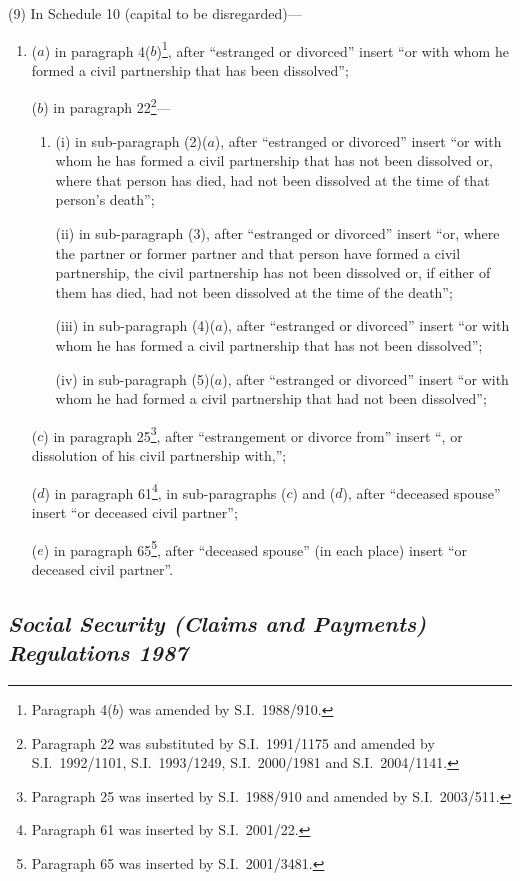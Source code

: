 \documentclass[12pt,a4paper]{article}
\begin{document}
(9) In Schedule 10 (capital to be disregarded)—
\begin{enumerate}\item[]
($a$) in paragraph 4($b$)\footnote{Paragraph 4($b$) was amended by S.I.\ 1988/910.}, after “estranged or divorced” insert “or with whom he formed a civil partnership that has been dissolved”;

($b$) in paragraph 22\footnote{Paragraph 22 was substituted by S.I.\ 1991/1175 and amended by S.I.\ 1992/1101, S.I.\ 1993/1249, S.I.\ 2000/1981 and S.I.\ 2004/1141.}—
\begin{enumerate}\item[]
(i) in sub-paragraph (2)($a$), after “estranged or divorced” insert “or with whom he has formed a civil partnership that has not been dissolved or, where that person has died, had not been dissolved at the time of that person’s death”;

(ii) in sub-paragraph (3), after “estranged or divorced” insert “or, where the partner or former partner and that person have formed a civil partnership, the civil partnership has not been dissolved or, if either of them has died, had not been dissolved at the time of the death”;

(iii) in sub-paragraph (4)($a$), after “estranged or divorced” insert “or with whom he has formed a civil partnership that has not been dissolved”;

(iv) in sub-paragraph (5)($a$), after “estranged or divorced” insert “or with whom he had formed a civil partnership that had not been dissolved”;
\end{enumerate}

($c$) in paragraph 25\footnote{Paragraph 25 was inserted by S.I.\ 1988/910 and amended by S.I.\ 2003/511.}, after “estrangement or divorce from” insert “, or dissolution of his civil partnership with,”;

($d$) in paragraph 61\footnote{Paragraph 61 was inserted by S.I.\ 2001/22.}, in sub-paragraphs ($c$)  and ($d$), after “deceased spouse” insert “or deceased civil partner”;

($e$) in paragraph 65\footnote{Paragraph 65 was inserted by S.I.\ 2001/3481.}, after “deceased spouse” (in each place) insert “or deceased civil partner”.
\end{enumerate}

\subsection*{\itshape Social Security (Claims and Payments) Regulations 1987}
\end{document}
